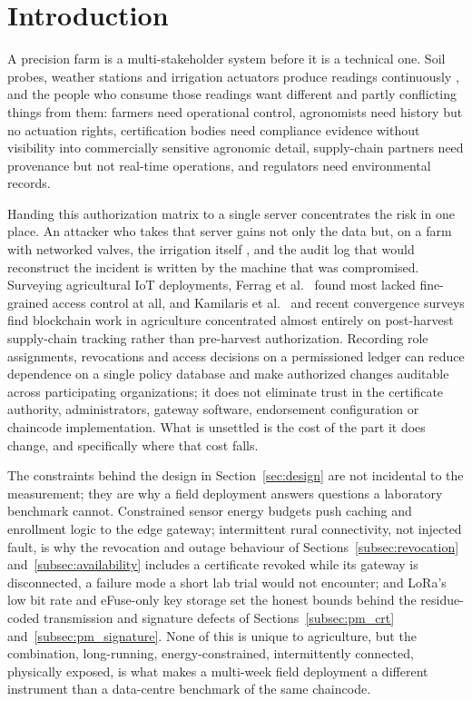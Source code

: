 \documentclass[a4paper,fleqn]{cas-sc}
\begin{document}
\section{Introduction}
\label{sec:intro}

A precision farm is a multi-stakeholder system before it is a technical one.
Soil probes, weather stations and irrigation actuators produce readings
continuously \cite{zhang2002precision}, and the people who consume those
readings want different and partly conflicting things from them: farmers
need operational control, agronomists need history but no actuation rights,
certification bodies need compliance evidence without visibility into
commercially sensitive agronomic detail, supply-chain partners need
provenance but not real-time operations, and regulators need environmental
records.

Handing this authorization matrix to a single server concentrates the risk
in one place. An attacker who takes that server gains not only the data but,
on a farm with networked valves, the irrigation itself
\cite{benedict2021decentralized}, and the audit log that would reconstruct
the incident is written by the machine that was compromised. Surveying
agricultural IoT deployments, Ferrag et al.\ \cite{ferrag2020security} found
most lacked fine-grained access control at all, and Kamilaris et
al.\ \cite{kamilaris2019rise} and recent convergence surveys
\cite{rustemi2025synergizing} find blockchain work in agriculture
concentrated almost entirely on post-harvest supply-chain tracking rather
than pre-harvest authorization. Recording role assignments, revocations
and access decisions on a permissioned ledger can reduce dependence on a
single policy database and make authorized changes auditable across
participating organizations; it does not eliminate trust in the
certificate authority, administrators, gateway software, endorsement
configuration or chaincode implementation. What is unsettled is the
cost of the part it does change, and specifically where that cost falls.

The constraints behind the design in Section~\ref{sec:design} are not
incidental to the measurement; they are why a field deployment answers
questions a laboratory benchmark cannot. Constrained sensor energy budgets
push caching and enrollment logic to the edge gateway; intermittent rural
connectivity, not injected fault, is why the revocation and outage
behaviour of Sections~\ref{subsec:revocation}
and~\ref{subsec:availability} includes a certificate revoked while its
gateway is disconnected, a failure mode a short lab trial would not
encounter; and LoRa's low bit rate and eFuse-only key storage set the
honest bounds behind the residue-coded transmission and signature defects
of Sections~\ref{subsec:pm_crt} and~\ref{subsec:pm_signature}. None of
this is unique to agriculture, but the combination, long-running,
energy-constrained, intermittently connected, physically exposed, is what
makes a multi-week field deployment a different instrument than a
data-centre benchmark of the same chaincode.
\end{document}
